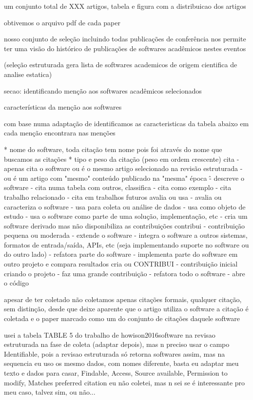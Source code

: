 um conjunto total de  XXX artigos, tabela e figura com a distribuicao
dos artigos

obtivemos o arquivo pdf de cada paper

nosso conjunto de seleção incluindo todas publicações de conferência
nos permite ter uma visão do histórico de publicações de softwares
acadêmicos nestes eventos

(seleção estruturada gera lista de softwares academicos de origem cientifica de analise estatica)

secao: identificando menção aos softwares acadêmicos selecionados

características da menção aos softwares

com base numa adaptação de \cite{howison2016software} identificamos as caracteristicas
da tabela abaixo em cada menção encontrara nas menções

* nome do software, toda citação tem nome pois foi através do nome que buscamos as citações
* tipo e peso da citação (peso em ordem crescente)
cita
  - apenas cita o software ou é o mesmo artigo selecionado na revisão estruturada
  - ou é um artigo com "mesmo" conteúdo publicado na "mesma" época \^
  - descreve o software
  - cita numa tabela com outros, classifica
  - cita como exemplo
  - cita trabalho relacionado
  - cita em trabalhos futuros
avalia ou usa
  - avalia ou caracteriza o software
  - usa para coleta ou análise de dados
  - usa como objeto de estudo
  - usa o software como parte de uma solução, implementação, etc
  - cria um software derivado mas não disponibiliza as contribuições
contribui
  - contribuição pequena ou moderada
  - extende o software
  - integra o software a outros sistemas, formatos de entrada/saída, APIs, etc
    (seja implementando suporte no software ou do outro lado)
  - refatora parte do software
  - implementa parte do software em outro projeto e compara resultados
cria ou CONTRIBUI
  - contribuição inicial criando o projeto
  - faz uma grande contribuição
  - refatora todo o software
  - abre o código

apesar de ter coletado não coletamos apenas citações formais, qualquer citação,
sem distinção, desde que deixe aparente que o artigo utiliza o software a citação
é coletada e o paper marcado como um do conjunto de citações daquele software

usei a tabela TABLE 5 do trabalho de howison2016software na revisao estruturada
na fase de coleta (adaptar depois), mas n preciso usar o campo Identifiable, pois
a revisao estruturada só retorna softwares assim, mas na sequencia eu uso os
mesmo dados, com nomes diferente, basta eu adaptar meu texto e dados para casar,
Findable, Access, Source available, Permission to modify, Matches preferred citation eu
não coletei, mas n sei se é interessante pro meu caso, talvez sim, ou não...

